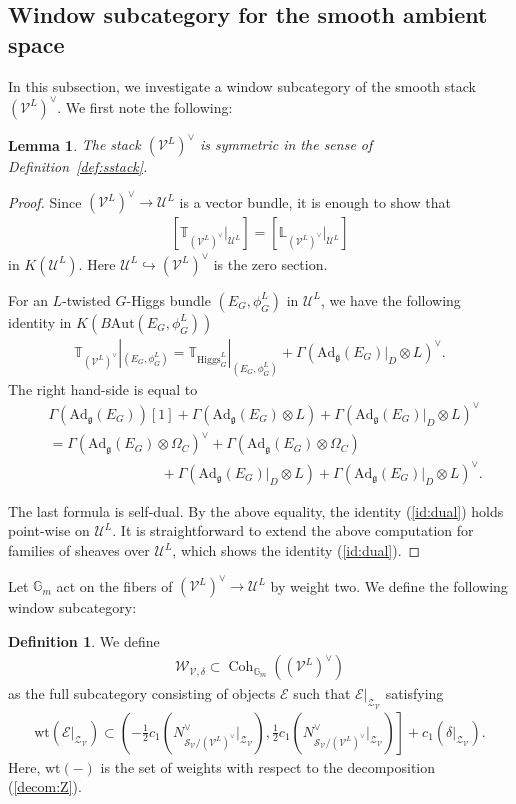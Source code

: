 \documentclass [11pt,oneside,a4paper,mathscr]{amsart}
\newtheorem{lemma}[thm]{Lemma}
\theoremstyle{definition}
\newtheorem{defn}[thm]{Definition}
\newcommand{\E}{\mathcal{E}}
\newcommand{\sS}{\mathcal{S}}
\newcommand{\zZ}{\mathcal{Z}}
\newcommand{\U}{\mathcal{U}}
\newcommand{\V}{\mathcal{V}}
\newcommand{\fg}{\mathfrak{g}}
\newcommand{\Coh}{\operatorname{Coh}}
\newcommand{\Ad}{\mathrm{Ad}}
\newcommand{\wt}{\mathrm{wt}}
\newcommand{\Hig}{\mathrm{Higgs}}
\begin{document}
  \subsection{Window subcategory for the smooth ambient space} 
In this subsection, we investigate a window subcategory of 
 the smooth stack $(\V^L)^{\vee}$. 
We first note the following: 
\begin{lemma}\label{lem:sym:V}
The stack $(\V^L)^{\vee}$ is symmetric in the sense of Definition~\ref{def:sstack}.     
\end{lemma}
\begin{proof}
Since $(\V^L)^{\vee} \to \U^L$ is a vector bundle, 
it is enough to show that
\begin{align}\label{id:dual}
    [\mathbb{T}_{(\V^L)^{\vee}}|_{\U^L}]= [\mathbb{L}_{(\V^L)^{\vee}}|_{\U^L}]
\end{align}
in $K(\U^L)$. Here $\U^L \hookrightarrow (\V^L)^{\vee}$ is the zero section. 

For an $L$-twisted $G$-Higgs bundle $(E_G, \phi_G^{L})$ in $\U^L$, 
we have the following identity in $K(B\mathrm{Aut}(E_G, \phi_G^{L}))$
\begin{align*}
\mathbb{T}_{(\V^L)^{\vee}}|_{(E_G, \phi_G^{L})} 
= \mathbb{T}_{\Hig_G^{L}}|_{(E_G, \phi_G^{L})}+\Gamma(\Ad_{\fg}(E_G)|_{D}\otimes L)^{\vee}.
\end{align*}
The right hand-side is equal to 
\begin{align*}
&\Gamma(\Ad_{\fg}(E_G))[1]+\Gamma(\Ad_{\fg}(E_G)\otimes L)+\Gamma(\Ad_{\fg}(E_G)|_{D}\otimes L)^{\vee} \\
&=\Gamma(\Ad_{\fg}(E_G)\otimes \Omega_C)^{\vee}+\Gamma(\Ad_{\fg}(E_G)\otimes \Omega_C) \\
&\qquad \qquad \qquad \qquad  +\Gamma(\Ad_{\fg}(E_G)|_{D}\otimes L)+
\Gamma(\Ad_{\fg}(E_G)|_{D}\otimes L)^{\vee}.
\end{align*}

The last formula is self-dual. 
By the above equality, the identity (\ref{id:dual}) holds point-wise on $\mathcal{U}^L$. 
It is straightforward 
to extend the above computation for families of sheaves over $\U^L$, which 
shows the identity (\ref{id:dual}). 
\end{proof}
Let $\mathbb{G}_m$ act on the fibers of 
$(\V^L)^{\vee} \to \U^L$ by weight two. We define the following window 
subcategory: 
\begin{defn}\label{def:window:V}
We define 
\begin{align*}
    \mathcal{W}_{\V, \delta} \subset \Coh_{\mathbb{G}_m}((\V^L)^{\vee})
\end{align*}
as the full subcategory consisting of objects $\mathcal{E}$ such that $\mathcal{E}|_{\zZ_{\V}}$ satisfying 
\begin{align*}
    \wt(\E|_{\zZ_{\V}}) \subset 
    \left(-\frac{1}{2}c_1 (N_{\sS_{\V}/(\V^L)^{\vee}}^{\vee}|_{\zZ_{\V}}), 
    \frac{1}{2}c_1 (N_{\sS_{\V}/(\V^L)^{\vee}}^{\vee}|_{\zZ_{\V}})
    \right]+c_1(\delta|_{\zZ_{\V}}). 
\end{align*}
Here, $\wt(-)$ is the set of weights with respect to the decomposition (\ref{decom:Z}). 
\end{defn}
\end{document}
